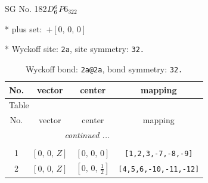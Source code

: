 \documentclass[fleqn,8pt]{jsarticle}
\begin{document}
\setcounter{MaxMatrixCols}{32}

\renewcommand{\tablename}{Table~}
\renewcommand{\figurename}{Figure~}
\begin{center}
\LARGE
SG No. 182\quad$D_{\rm 6}^{6}$\quad$P6_322$\quad[ hexagonal ]
\end{center}

* plus set:\,\,\,$+\left[ 0,\, 0,\, 0 \right]$


* Wyckoff site: {\tt 2a}, site symmetry: {\tt 32.}
\renewcommand{\arraystretch}{1.2}
\begin{longtable}{cccc}
\caption{Wyckoff bond: {\tt 2a@2a}, bond symmetry: {\tt 32.}}
 \\
 \hline \hline
No. & vector & center & mapping \\ \hline \endfirsthead

\multicolumn{3}{l}{\tablename\ \thetable{}} \\
 \hline \hline
No. & vector & center & mapping \\ \hline \endhead

 \hline \hline
\multicolumn{3}{r}{\footnotesize\it continued ...} \\ \endfoot

 \hline \hline
\multicolumn{3}{r}{} \\ \endlastfoot

1 & $\left[ 0,\, 0,\, Z \right]$ & $\left[ 0,\, 0,\, 0 \right]$ & {\tt [1,2,3,-7,-8,-9]} \\ \hline
2 & $\left[ 0,\, 0,\, Z \right]$ & $\left[ 0,\, 0,\, \frac{1}{2} \right]$ & {\tt [4,5,6,-10,-11,-12]} \\
\end{longtable}
\renewcommand{\arraystretch}{1.2}
\end{document}

